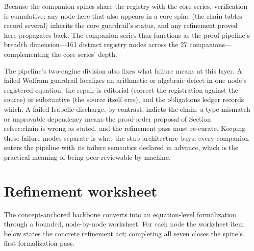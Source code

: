 \documentclass[11pt]{article}
\theoremstyle{remark}
\begin{document}
Because the companion spines share the registry with the core series, verification is cumulative: any node here that also appears in a core spine (the chain tables record several) inherits the core guardrail's status, and any refinement proved here propagates back. The companion series thus functions as the proof pipeline's breadth dimension---161 distinct registry nodes across the 27 companions---complementing the core series' depth.

The pipeline's two-engine division also fixes what failure means at this layer. A failed Wolfram guardrail localizes an arithmetic or algebraic defect in one node's registered equation: the repair is editorial (correct the registration against the source) or substantive (the source itself errs), and the obligations ledger records which. A failed Isabelle discharge, by contrast, indicts the chain: a type mismatch or unprovable dependency means the proof-order proposal of Section~\\ref{sec:chain} is wrong as stated, and the refinement pass must re-curate. Keeping these failure modes separate is what the stub architecture buys: every companion enters the pipeline with its failure semantics declared in advance, which is the practical meaning of being peer-reviewable by machine.

\section{Refinement worksheet}
\label{sec:worksheet}

The concept-anchored backbone converts into an equation-level formalization through a bounded, node-by-node worksheet. For each node the worksheet item below states the concrete refinement act; completing all seven closes the spine's first formalization pass.
\end{document}
